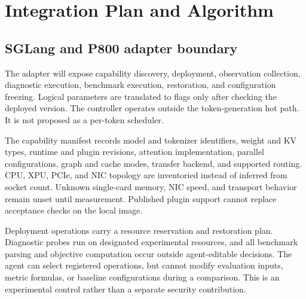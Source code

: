 \documentclass[11pt,a4paper]{article}
\begin{document}
\section{Integration Plan and Algorithm}
\subsection{SGLang and P800 adapter boundary}
The adapter will expose capability discovery, deployment, observation collection, diagnostic execution, benchmark execution, restoration, and configuration freezing. Logical parameters are translated to flags only after checking the deployed version. The controller operates outside the token-generation hot path. It is not proposed as a per-token scheduler.

The capability manifest records model and tokenizer identifiers, weight and KV types, runtime and plugin revisions, attention implementation, parallel configurations, graph and cache modes, transfer backend, and supported routing. CPU, XPU, PCIe, and NIC topology are inventoried instead of inferred from socket count. Unknown single-card memory, NIC speed, and transport behavior remain unset until measurement. Published plugin support cannot replace acceptance checks on the local image.

Deployment operations carry a resource reservation and restoration plan. Diagnostic probes run on designated experimental resources, and all benchmark parsing and objective computation occur outside agent-editable decisions. The agent can select registered operations, but cannot modify evaluation inputs, metric formulas, or baseline configurations during a comparison. This is an experimental control rather than a separate security contribution.
\end{document}
